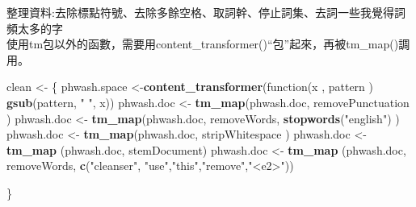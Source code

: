 \documentclass[]{article}
\newenvironment{Shaded}{\begin{snugshade}}{\end{snugshade}}
\newcommand{\KeywordTok}[1]{\textcolor[rgb]{0.13,0.29,0.53}{\textbf{{#1}}}}
\newcommand{\DataTypeTok}[1]{\textcolor[rgb]{0.13,0.29,0.53}{{#1}}}
\newcommand{\DecValTok}[1]{\textcolor[rgb]{0.00,0.00,0.81}{{#1}}}
\newcommand{\StringTok}[1]{\textcolor[rgb]{0.31,0.60,0.02}{{#1}}}
\newcommand{\NormalTok}[1]{{#1}}
\begin{document}
\begin{Shaded}
\end{Shaded}

整理資料:去除標點符號、去除多餘空格、取詞幹、停止詞集、去詞一些我覺得詞頻太多的字\\
使用tm包以外的函數，需要用content\_transformer()``包''起來，再被tm\_map()調用。

\begin{Shaded}
\begin{Highlighting}[]
\NormalTok{clean <-}\StringTok{ }\NormalTok{\{}
  \NormalTok{phwash.space <-}\KeywordTok{content_transformer}\NormalTok{(function(x , pattern ) }\KeywordTok{gsub}\NormalTok{(pattern, }\StringTok{" "}\NormalTok{, x))}
  \NormalTok{phwash.doc <-}\StringTok{ }\KeywordTok{tm_map}\NormalTok{(phwash.doc, removePunctuation )}
  \NormalTok{phwash.doc <-}\StringTok{ }\KeywordTok{tm_map}\NormalTok{(phwash.doc, removeWords, }\KeywordTok{stopwords}\NormalTok{(}\StringTok{"english"}\NormalTok{) )}
  \NormalTok{phwash.doc <-}\StringTok{ }\KeywordTok{tm_map}\NormalTok{(phwash.doc, stripWhitespace )}
  \NormalTok{phwash.doc <-}\StringTok{ }\KeywordTok{tm_map} \NormalTok{(phwash.doc, stemDocument)}
  \NormalTok{phwash.doc <-}\StringTok{ }\KeywordTok{tm_map} \NormalTok{(phwash.doc, removeWords, }\KeywordTok{c}\NormalTok{(}\StringTok{"cleanser"}\NormalTok{, }\StringTok{"use"}\NormalTok{,}\StringTok{"this"}\NormalTok{,}\StringTok{"remove"}\NormalTok{,}\StringTok{"<e2>"}\NormalTok{))}
  
\NormalTok{\}}
\end{Highlighting}
\end{Shaded}
\end{document}

